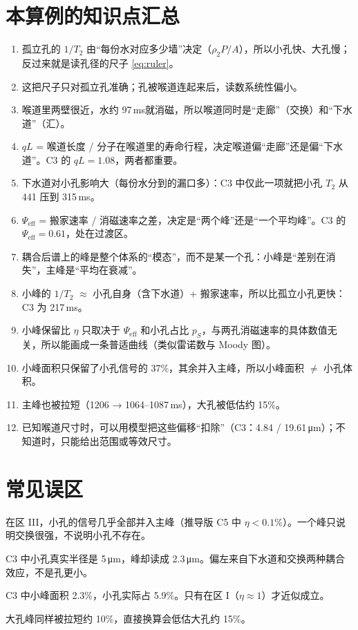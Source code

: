 \documentclass[11pt,a4paper]{article}
\newcommand{\Peff}{\Psi_{\mathrm{eff}}}
\newcommand{\um}{\,\si{\micro m}}
\newcommand{\ms}{\,\si{ms}}
\begin{document}
\section{本算例的知识点汇总}

\begin{enumerate}[leftmargin=1.6em,itemsep=2pt]
\item 孤立孔的 $1/T_2$ 由“每份水对应多少墙”决定（$\rho_2P/A$），所以小孔快、大孔慢；反过来就是读孔径的尺子 \eqref{eq:ruler}。
\item 这把尺子只对孤立孔准确；孔被喉道连起来后，读数系统性偏小。
\item 喉道里两壁很近，水约 97\ms 就消磁，所以喉道同时是“走廊”（交换）和“下水道”（汇）。
\item $qL$ = 喉道长度 / 分子在喉道里的寿命行程，决定喉道偏“走廊”还是偏“下水道”。C3 的 $qL=1.08$，两者都重要。
\item 下水道对小孔影响大（每份水分到的漏口多）：C3 中仅此一项就把小孔 $T_2$ 从 441 压到 315\ms。
\item $\Peff$ = 搬家速率 / 消磁速率之差，决定是“两个峰”还是“一个平均峰”。C3 的 $\Peff=0.61$，处在过渡区。
\item 耦合后谱上的峰是整个体系的“模态”，而不是某一个孔：小峰是“差别在消失”，主峰是“平均在衰减”。
\item 小峰的 $1/T_2$ $\approx$ 小孔自身（含下水道）+ 搬家速率，所以比孤立小孔更快：C3 为 217\ms。
\item 小峰保留比 $\eta$ 只取决于 $\Peff$ 和小孔占比 $p_S$，与两孔消磁速率的具体数值无关，所以能画成一条普适曲线（类似雷诺数与 Moody 图）。
\item 小峰面积只保留了小孔信号的 37\%，其余并入主峰，所以小峰面积 $\neq$ 小孔体积。
\item 主峰也被拉短（1206 → 1064--1087\ms），大孔被低估约 15\%。
\item 已知喉道尺寸时，可以用模型把这些偏移“扣除”（C3：4.84 / 19.61\um）；不知道时，只能给出范围或等效尺寸。
\end{enumerate}

\section{常见误区}

\begin{pitfall}
在区 III，小孔的信号几乎全部并入主峰（推导版 C5 中 $\eta<0.1\%$）。一个峰只说明交换很强，不说明小孔不存在。
\end{pitfall}
\begin{pitfall}
C3 中小孔真实半径是 5\um，峰却读成 2.3\um。偏左来自下水道和交换两种耦合效应，不是孔更小。
\end{pitfall}
\begin{pitfall}[误区 3：“小峰面积就是小孔的体积分数”]
C3 中小峰面积 2.3\%，小孔实际占 5.9\%。只有在区 I（$\eta\approx1$）才近似成立。
\end{pitfall}
\begin{pitfall}
大孔峰同样被拉短约 10\%，直接换算会低估大孔约 15\%。
\end{pitfall}
\end{document}
